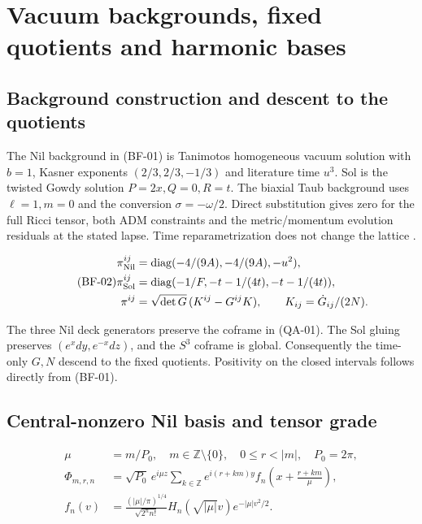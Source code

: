 \section{Vacuum backgrounds, fixed quotients and harmonic bases}

\subsection{Background construction and descent to the quotients}

The Nil background in (BF-01) is Tanimoto\textquotesingle s homogeneous vacuum solution with $b=1$, Kasner exponents $(2/3,2/3,-1/3)$ and literature time $u^3$. Sol is the twisted Gowdy solution $P=2x,Q=0,R=t$. The biaxial Taub background uses $\ell=1,m=0$ and the conversion $\sigma=-\omega/2$. Direct substitution gives zero for the full Ricci tensor, both ADM constraints and the metric/momentum evolution residuals at the stated lapse. Time reparametrization does not change the lattice \cite{Tanimoto2004,Rendall2012,BeyerHennig2012}.

\begin{equation}\tag{BF-02}\label{eq:BF-02}
\begin{aligned}
\pi_{\rm Nil}^{ij}&=\mathrm{diag}(-4/(9A),-4/(9A),-u^2),\\
\pi_{\rm Sol}^{ij}&=\mathrm{diag}(-1/F,-t-1/(4t),-t-1/(4t)),\\
\pi^{ij}&=\sqrt{\det G}\,(K^{ij}-G^{ij}K),\qquad K_{ij}=\dot G_{ij}/(2N).
\end{aligned}
\end{equation}

The three Nil deck generators preserve the coframe in (QA-01). The Sol gluing preserves $(e^xdy,e^{-x}dz)$, and the $S^3$ coframe is global. Consequently the time-only $G,N$ descend to the fixed quotients. Positivity on the closed intervals follows directly from (BF-01).

\subsection{Central-nonzero Nil basis and tensor grade}

\begin{equation}\tag{NF-01}\label{eq:NF-01}
\begin{aligned}
\mu&=m/P_0,\quad m\in\mathbb Z\setminus\{0\},\quad 0\le r<|m|,\quad P_0=2\pi,\\
\Phi_{m,r,n}&=\sqrt{P_0}\,e^{i\mu z}\sum_{k\in\mathbb Z}
 e^{i(r+km)y}f_n\!\left(x+\frac{r+km}{\mu}\right),\\
f_n(v)&=\frac{(|\mu|/\pi)^{1/4}}{\sqrt{2^nn!}}
 H_n(\sqrt{|\mu|}v)e^{-|\mu|v^2/2}.
\end{aligned}
\end{equation}

